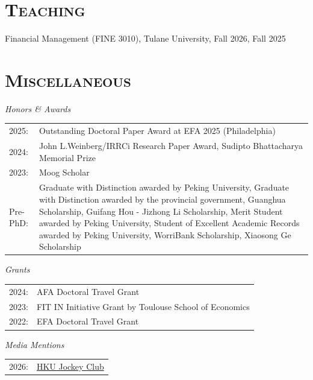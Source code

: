 \documentclass[11pt]{article}
\renewenvironment{itemize}{
  \begin{list}{}{
    \setlength{\leftmargin}{1.5em}
  }
}{
  \end{list}
}
\begin{document}
\section*{\textsc{Teaching}}

\begin{itemize}

\item Financial Management (FINE 3010), Tulane University, Fall 2026, Fall 2025

\end{itemize}



\section*{\textsc{Miscellaneous}}
\begin{itemize}
\item \textit{Honors \& Awards}
\begin{tabularx}{\linewidth}{@{}l@{\quad}X@{}}
\\[-0.8em]
2025: & Outstanding Doctoral Paper Award at EFA 2025 (Philadelphia) \\
2024: & John L.\;Weinberg/IRRCi Research Paper Award, Sudipto Bhattacharya Memorial Prize \\
2023: & Moog Scholar \\
Pre-PhD: & Graduate with Distinction awarded by Peking University, Graduate with Distinction awarded by the provincial government, Guanghua Scholarship, Guifang Hou - Jizhong Li Scholarship, Merit Student awarded by Peking University, Student of Excellent Academic Records awarded by Peking University, WorriBank Scholarship, Xiaosong Ge Scholarship \\
\end{tabularx}
\item \textit{Grants}
\begin{tabularx}{\linewidth}{@{}l@{\quad}X@{}}
\\[-0.8em]
2024: & AFA Doctoral Travel Grant \\
2023: & FIT IN Initiative Grant by Toulouse School of Economics \\
2022: & EFA Doctoral Travel Grant \\
\end{tabularx}
\item \textit{Media Mentions}
\begin{tabularx}{\linewidth}{@{}l@{\quad}X@{}}
\\[-0.8em]
2026: & \href{https://hkujcesgri.hku.hk/board-connections-firm-profitability-and-product-market-actions/}{HKU Jockey Club} \\

\end{tabularx}
\end{itemize}
\end{document}
